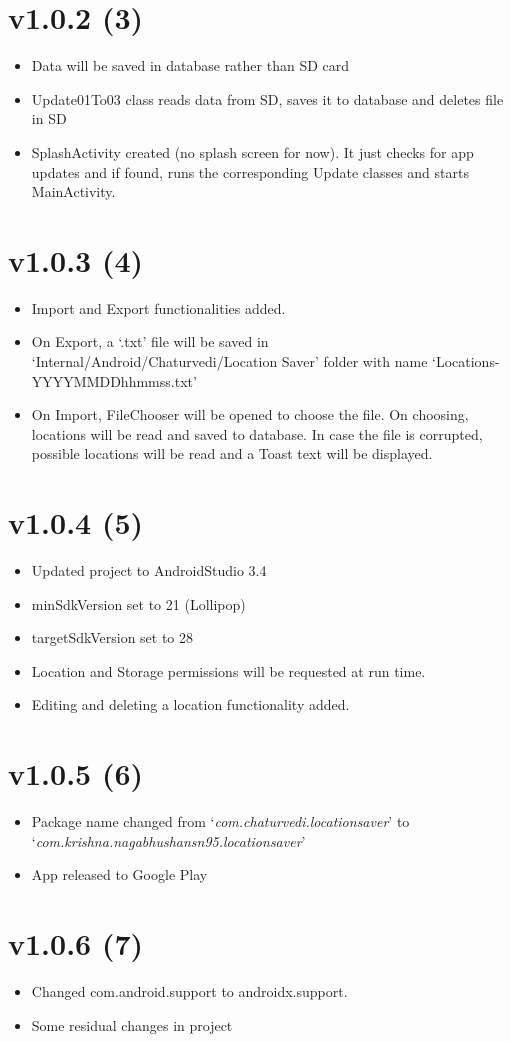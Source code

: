 \documentclass{article}
\begin{document}
    \section{v1.0.2 (3)}\label{sec:3}
    \begin{itemize}
        \item Data will be saved in database rather than SD card
        \item Update01To03 class reads data from SD, saves it to database and deletes file in SD
        \item SplashActivity created (no splash screen for now). It just checks for app updates and if found, runs the corresponding Update classes and starts MainActivity.
    \end{itemize}


    \section{v1.0.3 (4)}\label{sec:4}
    \begin{itemize}
        \item Import and Export functionalities added.
        \item On Export, a `.txt' file will be saved in `Internal/Android/Chaturvedi/Location Saver' folder with name `Locations-YYYYMMDDhhmmss.txt'
        \item On Import, FileChooser will be opened to choose the file. On choosing, locations will be read and saved to database. In case the file is corrupted, possible locations will be read and a Toast text will be displayed.
    \end{itemize}


    \section{v1.0.4 (5)}\label{sec:5}
    \begin{itemize}
        \item Updated project to AndroidStudio 3.4
        \item minSdkVersion set to 21 (Lollipop)
        \item targetSdkVersion set to 28
        \item Location and Storage permissions will be requested at run time.
        \item Editing and deleting a location functionality added.
    \end{itemize}


    \section{v1.0.5 (6)}\label{sec:6}
    \begin{itemize}
        \item Package name changed from `\textit{com.chaturvedi.locationsaver}' to `\textit{com.krishna.nagabhushansn95.locationsaver}'
        \item App released to Google Play
    \end{itemize}


    \section{v1.0.6 (7)}\label{sec:7}
    \begin{itemize}
        \item Changed com.android.support to androidx.support.
        \item Some residual changes in project
    \end{itemize}
\end{document}
